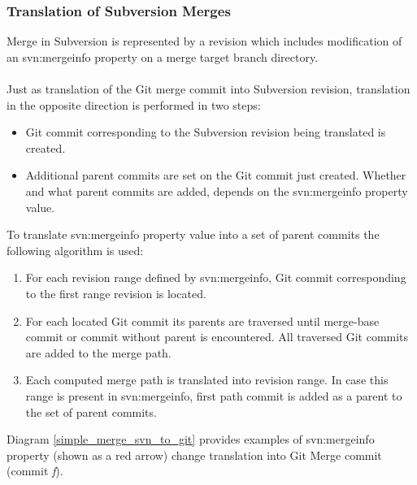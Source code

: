 \subsubsection{Translation of Subversion Merges}
\label{section_subversion_merge_to_git}
Merge in Subversion is represented by a revision which includes modification of an svn:mergeinfo property
on a merge target branch directory.
\\\\
Just as translation of the Git merge commit into Subversion revision, 
translation in the opposite direction is performed in two steps:
\begin{itemize}
\item Git commit corresponding to the Subversion revision being translated is created.
\item Additional parent commits are set on the Git commit just created. 
Whether and what parent commits are added, depends on the svn:mergeinfo property value.
\end{itemize}
To translate svn:mergeinfo property value into a set of parent commits the following algorithm is used:
\begin{enumerate}
\item For each revision range defined by svn:mergeinfo, Git commit corresponding to the first range
revision is located.
\item For each located Git commit its parents are traversed until merge-base commit or commit without
parent is encountered. All traversed Git commits are added to the merge path.
\item Each computed merge path is translated into revision range. In case this range is present in 
svn:mergeinfo, first path commit is added as a parent to the set of parent commits.
\end{enumerate}
Diagram \ref{simple_merge_svn_to_git} provides
examples of svn:mergeinfo property (shown as a red arrow) change translation into Git Merge commit (commit \emph{f}).

